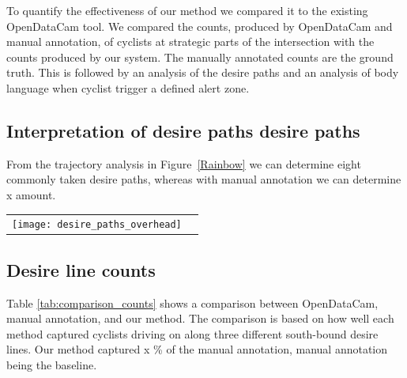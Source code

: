 To quantify the effectiveness of our method we compared it to the existing OpenDataCam tool.
We compared the counts, produced by OpenDataCam and manual annotation, of cyclists at strategic parts of the 
intersection with the counts produced by our system. The manually annotated counts are the ground truth.
This is followed by an analysis of the desire paths and an analysis of body language when cyclist trigger a defined
alert zone.
\ \\ 

\subsection{Interpretation of desire paths desire paths}
From the trajectory analysis in Figure~\ref{Rainbow} we can determine eight commonly taken desire paths,  
whereas with manual annotation we can determine x amount.
\ \\

\raggedbottom
\begin{tabular}{@{}cc}
\texttt{[image: desire\_paths\_overhead]} 
\end{tabular}
\label{traject}

\subsection{Desire line counts}
Table \ref{tab:comparison_counts} shows a comparison between OpenDataCam, manual annotation, and our method.
The comparison is based on how well each method captured cyclists driving on along three different 
south-bound desire lines.
Our method captured x \% of the manual annotation, manual annotation being the baseline.
\ \\

\begin{table}[]
\caption{Comparison of counts}
\label{tab:comparison_counts}
\end{table}

